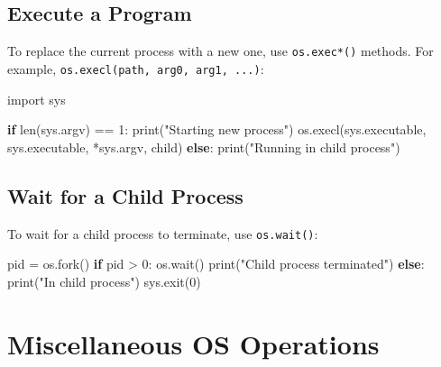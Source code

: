 \documentclass[
  letterpaper,
  DIV=11,
  numbers=noendperiod]{scrreprt}
\newenvironment{Shaded}{\begin{snugshade}}{\end{snugshade}}
\newcommand{\BuiltInTok}[1]{\textcolor[rgb]{0.00,0.23,0.31}{#1}}
\newcommand{\ControlFlowTok}[1]{\textcolor[rgb]{0.00,0.23,0.31}{\textbf{#1}}}
\newcommand{\DecValTok}[1]{\textcolor[rgb]{0.68,0.00,0.00}{#1}}
\newcommand{\ImportTok}[1]{\textcolor[rgb]{0.00,0.46,0.62}{#1}}
\newcommand{\NormalTok}[1]{\textcolor[rgb]{0.00,0.23,0.31}{#1}}
\newcommand{\OperatorTok}[1]{\textcolor[rgb]{0.37,0.37,0.37}{#1}}
\newcommand{\StringTok}[1]{\textcolor[rgb]{0.13,0.47,0.30}{#1}}
\begin{document}
\subsection{Execute a Program}\label{execute-a-program}

To replace the current process with a new one, use \texttt{os.exec*()}
methods. For example, \texttt{os.execl(path,\ arg0,\ arg1,\ ...)}:

\begin{Shaded}
\begin{Highlighting}[]
\ImportTok{import}\NormalTok{ sys}

\ControlFlowTok{if} \BuiltInTok{len}\NormalTok{(sys.argv) }\OperatorTok{==} \DecValTok{1}\NormalTok{:}
    \BuiltInTok{print}\NormalTok{(}\StringTok{"Starting new process"}\NormalTok{)}
\NormalTok{    os.execl(sys.executable, sys.executable, }\OperatorTok{*}\NormalTok{sys.argv, }\StringTok{\textquotesingle{}child\textquotesingle{}}\NormalTok{)}
\ControlFlowTok{else}\NormalTok{:}
    \BuiltInTok{print}\NormalTok{(}\StringTok{"Running in child process"}\NormalTok{)}
\end{Highlighting}
\end{Shaded}

\subsection{Wait for a Child Process}\label{wait-for-a-child-process}

To wait for a child process to terminate, use \texttt{os.wait()}:

\begin{Shaded}
\begin{Highlighting}[]
\NormalTok{pid }\OperatorTok{=}\NormalTok{ os.fork()}
\ControlFlowTok{if}\NormalTok{ pid }\OperatorTok{\textgreater{}} \DecValTok{0}\NormalTok{:}
\NormalTok{    os.wait()}
    \BuiltInTok{print}\NormalTok{(}\StringTok{"Child process terminated"}\NormalTok{)}
\ControlFlowTok{else}\NormalTok{:}
    \BuiltInTok{print}\NormalTok{(}\StringTok{"In child process"}\NormalTok{)}
\NormalTok{    sys.exit(}\DecValTok{0}\NormalTok{)}
\end{Highlighting}
\end{Shaded}

\section{Miscellaneous OS Operations}\label{miscellaneous-os-operations}
\end{document}
